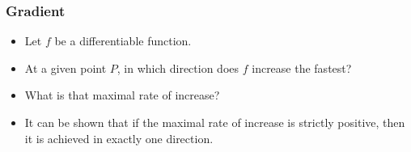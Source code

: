 \begin{frame}
\frametitle{Gradient}
\begin{itemize}
\item Let $f$ be a differentiable function.
\item At a given point $P$, in which direction does $f$ increase the fastest?
\item<2-> What is that maximal rate of increase?
\item<3-> It can be shown that if the maximal rate of increase is strictly positive, then it is achieved in exactly one direction. 
\end{itemize}

\end{frame}
